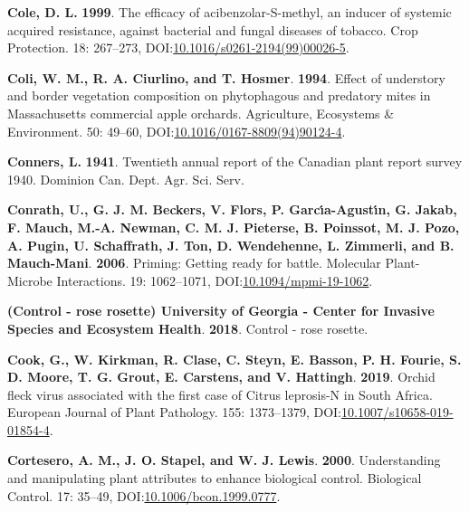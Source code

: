 \documentclass[12pt,final,CPage]{ufthesis}
\newlength{\cslhangindent}
\newenvironment{CSLReferences}[2] %
{%
	\setlength{\parindent}{0pt}
	\ifodd #1 \everypar{\setlength{\hangindent}{\cslhangindent}}\ignorespaces\fi
	\ifnum #2 > 0
	\setlength{\parskip}{#2\baselineskip}
	\fi
}%
{}
\begin{document}
{\begin{CSLReferences}{1}{0}
  \leavevmode{}%
  \textbf{Cole, D. L.} \textbf{1999}. The efficacy of acibenzolar-{S}-methyl, an inducer of systemic acquired resistance, against bacterial and fungal diseases of tobacco. Crop Protection. 18: 267--273, DOI:\href{https://doi.org/10.1016/s0261-2194(99)00026-5}{10.1016/s0261-2194(99)00026-5}.

  \leavevmode{}%
  \textbf{Coli, W. M., R. A. Ciurlino, and T. Hosmer}. \textbf{1994}. Effect of understory and border vegetation composition on phytophagous and predatory mites in {Massachusetts} commercial apple orchards. Agriculture, Ecosystems {\&} Environment. 50: 49--60, DOI:\href{https://doi.org/10.1016/0167-8809(94)90124-4}{10.1016/0167-8809(94)90124-4}.

  \leavevmode{}%
  \textbf{Conners, L.} \textbf{1941}. Twentieth annual report of the {Canadian} plant report survey 1940. Dominion Can. Dept. Agr. Sci. Serv.

  \leavevmode{}%
  \textbf{Conrath, U., G. J. M. Beckers, V. Flors, P. Garcı́a-Agustı́n, G. Jakab, F. Mauch, M.-A. Newman, C. M. J. Pieterse, B. Poinssot, M. J. Pozo, A. Pugin, U. Schaffrath, J. Ton, D. Wendehenne, L. Zimmerli, and B. Mauch-Mani}. \textbf{2006}. Priming: Getting ready for battle. Molecular Plant-Microbe Interactions{\textregistered}. 19: 1062--1071, DOI:\href{https://doi.org/10.1094/mpmi-19-1062}{10.1094/mpmi-19-1062}.

  \leavevmode{}%
  \textbf{(Control - rose rosette) University of Georgia - Center for Invasive Species and Ecosystem Health}. \textbf{2018}. Control - rose rosette.

  \leavevmode{}%
  \textbf{Cook, G., W. Kirkman, R. Clase, C. Steyn, E. Basson, P. H. Fourie, S. D. Moore, T. G. Grout, E. Carstens, and V. Hattingh}. \textbf{2019}. {Orchid fleck virus} associated with the first case of {Citrus leprosis}-{N} in {South Africa}. European Journal of Plant Pathology. 155: 1373--1379, DOI:\href{https://doi.org/10.1007/s10658-019-01854-4}{10.1007/s10658-019-01854-4}.

  \leavevmode{}%
  \textbf{Cortesero, A. M., J. O. Stapel, and W. J. Lewis}. \textbf{2000}. Understanding and manipulating plant attributes to enhance biological control. Biological Control. 17: 35--49, DOI:\href{https://doi.org/10.1006/bcon.1999.0777}{10.1006/bcon.1999.0777}.


\end{CSLReferences}}
\end{document}
